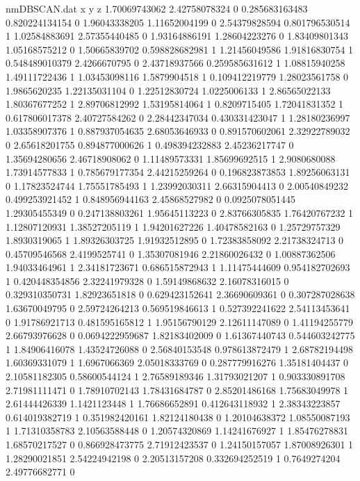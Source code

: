 \begin{filecontents}{nmDBSCAN.dat}
x y z
1.70069743062 2.42758078324 0
0.285683163483 0.820224134154 0
1.96043338205 1.11652004199 0
2.54379828594 0.801796530514 1
1.02584883691 2.57355440485 0
1.93164886191 1.28604223276 0
1.83409801343 1.05168575212 0
1.50665839702 0.598828682981 1
1.21456049586 1.91816830754 1
0.548489010379 2.4266670795 0
2.43718937566 0.259585631612 1
1.08815940258 1.49111722436 1
1.03453098116 1.5879904518 1
0.109412219779 1.28023561758 0
1.9865620235 1.22135031104 0
1.22512830724 1.0225006133 1
2.86565022133 1.80367677252 1
2.89706812992 1.53195814064 1
0.8209715405 1.72041831352 1
0.617806017378 2.40727584262 0
2.28442347034 0.430331423047 1
1.28180236997 1.03358907376 1
0.887937054635 2.68053646933 0
0.891570602061 2.32922789032 0
2.65618201755 0.894877000626 1
0.498394232883 2.45236217747 0
1.35694280656 2.46718908062 0
1.11489573331 1.85699692515 1
2.9080680088 1.73914577833 1
0.785679177354 2.44215259264 0
0.196823873853 1.89256063131 0
1.17823524744 1.75551785493 1
1.23992030311 2.66315904413 0
2.00540849232 0.499253921452 1
0.848956944163 2.45868527982 0
0.0925078051445 1.29305455349 0
0.247138803261 1.95645113223 0
2.83766305835 1.76420767232 1
1.12807120931 1.38527205119 1
1.94201627226 1.40478582163 0
1.25729757329 1.8930319065 1
1.89326303725 1.91932512895 0
1.72383858092 2.21738324713 0
0.45709546568 2.4199525741 0
1.35307081946 2.21860026432 0
1.00887362506 1.94033464961 1
2.34181723671 0.686515872943 1
1.11475444609 0.954182702693 1
0.420448354856 2.32241979328 0
1.59149868632 2.16078316015 0
0.329310350731 1.82923651818 0
0.629423152641 2.36690609361 0
0.307287028638 1.63670049795 0
2.59724264213 0.569519846613 1
0.527392241622 2.54113453641 0
1.91786921713 0.481595165812 1
1.95156790129 2.12611147089 0
1.41194255779 2.66793976628 0
0.0694222959687 1.82183402009 0
1.61367440743 0.544603242775 1
1.84906416078 1.43524726088 0
2.56840153548 0.978613872479 1
2.68782194498 1.60369331079 1
1.6967066369 2.05018333769 0
0.287779916276 1.35181404437 0
2.10581182305 0.58600544124 1
2.76589189346 1.31793021207 1
0.903330891708 2.71981111471 0
1.78910702143 1.78431684787 0
2.85201486168 1.75683049978 1
2.61444426339 1.1421123448 1
1.76686652891 0.412643118932 1
2.38343223857 0.614019382719 1
0.351982420161 1.82124180438 0
1.20104638372 1.08550087193 1
1.71310358783 2.10563588448 0
1.20574320869 1.14241676927 1
1.85476278831 1.68570217527 0
0.866928473775 2.71912423537 0
1.24150157057 1.87008926301 1
1.28290021851 2.54224942198 0
2.20513157208 0.332694252519 1
0.7649274204 2.49776682771 0

\end{filecontents}
